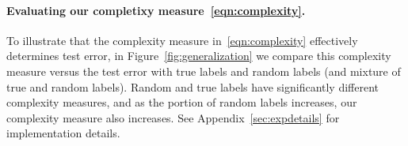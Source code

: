 


\paragraph{Evaluating our completixy measure~\eqref{eqn:complexity}.}
To illustrate that the complexity measure in~\eqref{eqn:complexity} effectively determines test error, in Figure~\ref{fig:generalization}
 we compare this complexity measure versus the test error with true labels and random labels (and mixture of true and random labels).
Random and true labels have significantly different complexity measures, and as the portion of random labels increases, our complexity measure also increases.
See Appendix~\ref{sec:expdetails} for implementation details.
